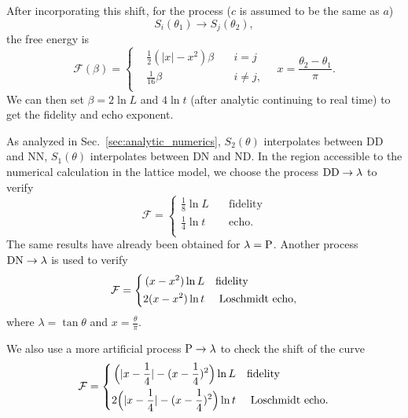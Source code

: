 After incorporating this shift, for the process ($c$ is assumed to be the same as $a$)
\begin{equation}
\label{eq:S_i_S_j}
S_i( \theta_1 ) \rightarrow S_j( \theta_2 ) ,
\end{equation}
the free energy is
\begin{equation}
\mathcal{F}( \beta )  = 
\left\lbrace
\begin{aligned}
  &\frac{1}{2}(|x| - x^2 )\beta  \quad &i = j \\
  &\frac{1}{16}\beta   \quad &i \ne j ,  \\
\end{aligned} \right. \quad x = \frac{\theta_2 - \theta_1}{\pi} .
\end{equation}
We can then set $\beta = 2 \ln L$ and $ 4 \ln t$ (after analytic continuing to real time) to get the fidelity and echo exponent. 

As analyzed in Sec.~\ref{sec:analytic_numerics}, $S_2( \theta)$ interpolates between DD and NN, $S_1( \theta )$ interpolates between DN and ND. In the region accessible to the numerical calculation in the lattice model, we choose the process ${\rm DD} \rightarrow  \lambda$ to verify
\begin{equation}
\label{eq:result_DDDD}
\mathcal{F} = 
\left\lbrace
\begin{aligned}
\frac{1}{8}\ln L  &\quad\text{fidelity}  \\
\frac{1}{4}\ln t   &\quad \text{echo} .  \\
\end{aligned} \right.  
\end{equation}
The same results have already been obtained for $\lambda = {\rm P}$\cite{stephan_logarithmic_2013,stephan_local_2011,vasseur_universal_2014,vasseur_crossover_2013,kennes_universal_2014}. Another process $\rm{DN} \rightarrow \lambda$ {\iffalse \color{red} in Eq.~\eqref{eq:DNDN}\fi} is used to verify
\begin{equation}
\label{eq:result_DNDN}
\mathcal{F} = 
\left\lbrace
\begin{aligned}
 (x - x^2 )\ln L   &  \quad {\rm fidelity} \\
 2(x - x^2 ) \ln t  & \quad \text{ Loschmidt echo} , \\
\end{aligned} \right. 
\end{equation}
where $\lambda = \tan \theta$ and $x = \frac{\theta}{\pi}$. 

We also use a more artificial process ${\rm P} \rightarrow \lambda$ to check the shift of the curve
\begin{equation}
\label{eq:periodic-case}
\mathcal{F} = 
\left\lbrace
\begin{aligned}
  \Big(|x-\frac{1}{4}| - (x-\frac{1}{4})^2 \Big)\ln L   &  \quad {\rm fidelity} \\
  2\Big(|x-\frac{1}{4}| - (x-\frac{1}{4})^2 \Big) \ln t  & \quad \text{ Loschmidt echo} .\\
\end{aligned} \right. 
\end{equation}



